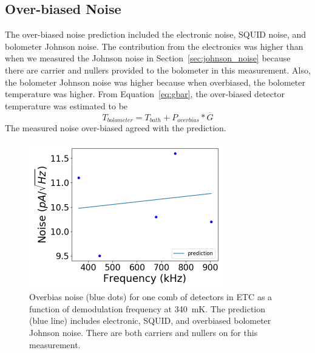 




\subsection{Over-biased Noise}
\label{sec:over_biased_noise}

The over-biased noise prediction included the electronic noise, \ac{SQUID} noise, and bolometer Johnson noise. 
The contribution from the electronics was higher than when we measured the Johnson noise in Section~\ref{sec:johnson_noise} because there are carrier and nullers provided to the bolometer in this measurement. 
Also, the bolometer Johnson noise was higher because when overbiased, the bolometer temperature was higher. 
From Equation~\ref{eq:gbar}, the over-biased detector temperature was estimated to be
\begin{equation}
T_{bolometer} = T_{bath} + P_{overbias}* \overline{G}
\end{equation}
The measured noise over-biased agreed with the prediction. 


\begin{figure}[ht!]
\begin{center}
\includegraphics[height=2.5in]{figures/overbias_noise.png}
\caption{Overbias noise (blue dots) for one comb of detectors in \ac{ETC} as a function of demodulation frequency at 340~mK. The prediction (blue line) includes electronic, \ac{SQUID}, and overbiased bolometer Johnson noise. There are both carriers and nullers on for this measurement.
\label{fig:overbias_noise} }
\end{center}
\end{figure}


